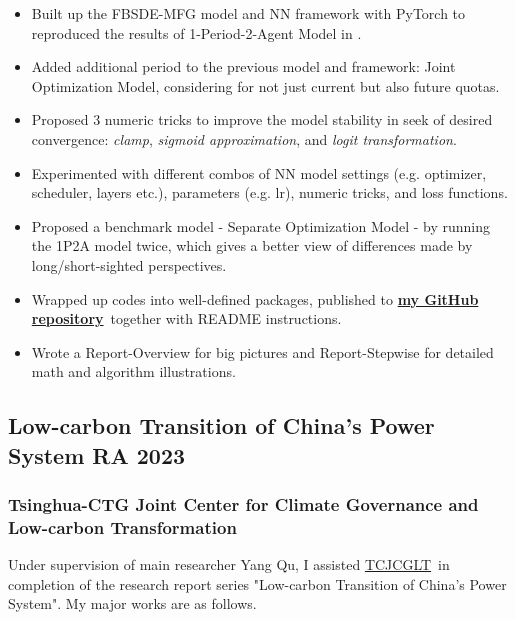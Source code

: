 \documentclass[a4paper]{article}
\newcommand{\TCJCGLT}{\href{https://www.jcglt.tsinghua.edu.cn/en/about/introduction.html}{TCJCGLT}}
\newcommand{\MFG}{\href{https://github.com/OrangeAoo/Multi-Period-Compliance-MFG-FBSDEs}{\textbf{my GitHub repository}}}
\begin{document}
\begin{itemize}
    \item Built up the FBSDE-MFG model and NN framework with PyTorch to reproduced the results of 1-Period-2-Agent Model in \cite{SC}.
    \item Added additional period to the previous model and framework: Joint Optimization Model, considering for not just current but also future quotas. 
    \item Proposed 3 numeric tricks to improve the model stability in seek of desired convergence: \textit{clamp}, \textit{sigmoid approximation}, and \textit{logit transformation}.
    \item Experimented with different combos of NN model settings (e.g. optimizer, scheduler, layers etc.), parameters (e.g. lr), numeric tricks, and loss functions.
    \item Proposed a benchmark model - Separate Optimization Model - by running the 1P2A model twice, which gives a better view of differences made by long/short-sighted perspectives. 
    \item Wrapped up codes into well-defined packages, published to \MFG\ together with README instructions. 
    \item Wrote a Report-Overview for big pictures and Report-Stepwise for detailed math and algorithm illustrations. 
\end{itemize}



\subsection{Low-carbon Transition of China's Power System \normalfont \hfill RA \hfill 2023} 
\subsubsection{Tsinghua-CTG Joint Center for Climate Governance and Low-carbon Transformation} 
\vspace{3pt}
\begin{adjustwidth}{10pt}{}
    Under supervision of main researcher Yang Qu, I assisted \TCJCGLT\ in completion of the research report series "Low-carbon Transition of China's Power System". My major works are as follows.
\end{adjustwidth}
\end{document}

